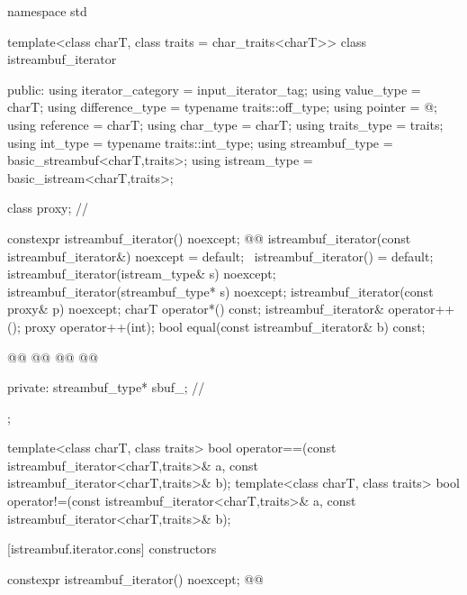 %
\begin{codeblock}
namespace std {
  template<class charT, class traits = char_traits<charT>>
  class istreambuf_iterator {
  public:
    using iterator_category = input_iterator_tag;
    using value_type        = charT;
    using difference_type   = typename traits::off_type;
    using pointer           = @\unspec@;
    using reference         = charT;
    using char_type         = charT;
    using traits_type       = traits;
    using int_type          = typename traits::int_type;
    using streambuf_type    = basic_streambuf<charT,traits>;
    using istream_type      = basic_istream<charT,traits>;

    class proxy;                          // \expos

    constexpr istreambuf_iterator() noexcept;
    @@
    istreambuf_iterator(const istreambuf_iterator&) noexcept = default;
    ~istreambuf_iterator() = default;
    istreambuf_iterator(istream_type& s) noexcept;
    istreambuf_iterator(streambuf_type* s) noexcept;
    istreambuf_iterator(const proxy& p) noexcept;
    charT operator*() const;
    istreambuf_iterator& operator++();
    proxy operator++(int);
    bool equal(const istreambuf_iterator& b) const;

    @@
    @@
    @@
    @@

  private:
    streambuf_type* sbuf_;                // \expos
  };

  template<class charT, class traits>
    bool operator==(const istreambuf_iterator<charT,traits>& a,
            const istreambuf_iterator<charT,traits>& b);
  template<class charT, class traits>
    bool operator!=(const istreambuf_iterator<charT,traits>& a,
            const istreambuf_iterator<charT,traits>& b);
}
\end{codeblock}


\setcounter{subsubsection}{1}
[istreambuf.iterator.cons]{ constructors}

\setcounter{Paras}{1}
%
\begin{itemdecl}
constexpr istreambuf_iterator() noexcept;
@@
\end{itemdecl}

